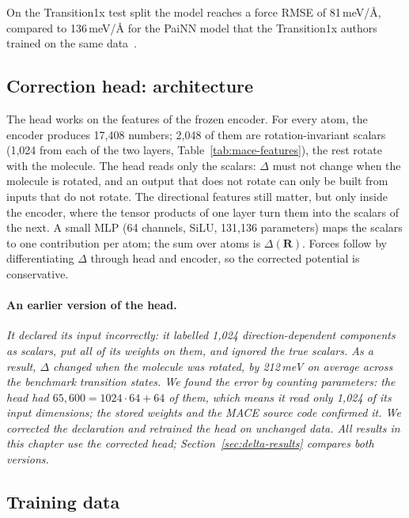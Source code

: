 On the Transition1x test split the model reaches a force RMSE of
81\,meV/\AA, compared to 136\,meV/\AA{} for the PaiNN model that the
Transition1x authors trained on the same data~\cite{schreiner2022}.

\subsection{Correction head: architecture}
\label{sec:delta-architecture}

The head works on the features of the frozen encoder. For every atom, the
encoder produces 17{,}408 numbers; 2{,}048 of them are rotation-invariant
scalars (1{,}024 from each of the two layers, Table~\ref{tab:mace-features}),
the rest rotate with the molecule. The head reads only the scalars: $\Delta$ must not change when the
molecule is rotated, and an output that does not rotate can only be
built from inputs that do not rotate. The directional features still
matter, but only inside
the encoder, where the tensor products of one layer turn them into the
scalars of the next. A small MLP (64 channels, SiLU, 131{,}136 parameters)
maps the scalars to one contribution per atom; the sum over atoms is
$\Delta(\mathbf{R})$. Forces follow by differentiating $\Delta$ through head
and encoder, so the corrected potential is conservative.



\paragraph{An earlier version of the head.} \emph{It declared its input
incorrectly: it labelled 1{,}024 direction-dependent components as scalars, put all of its weights on
them, and ignored the true scalars. As a result, $\Delta$ changed when the
molecule was rotated, by 212\,meV on average across the benchmark transition
states. We found the error by counting parameters: the head had
$65{,}600 = 1024 \cdot 64 + 64$ of them, which means it read only 1{,}024 of
its input dimensions; the stored weights and the MACE source code confirmed
it. We corrected the declaration and retrained the head on unchanged data.
All results in this chapter use the corrected head;
Section~\ref{sec:delta-results} compares both versions.}


\subsection{Training data}
\label{sec:delta-data}

